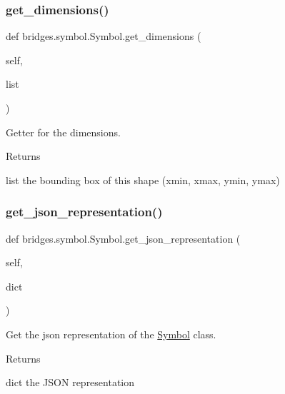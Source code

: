 \subsubsection{\texorpdfstring{get\+\_\+dimensions()}{get\_dimensions()}}
{\footnotesize\ttfamily def bridges.\+symbol.\+Symbol.\+get\+\_\+dimensions (\begin{DoxyParamCaption}\item[{}]{self,  }\item[{}]{list }\end{DoxyParamCaption})}



Getter for the dimensions. 

\begin{DoxyReturn}{Returns}


list the bounding box of this shape (xmin, xmax, ymin, ymax) 
\end{DoxyReturn}
\mbox{\label{classbridges_1_1symbol_1_1_symbol_a746f8e6d1fd1c63c8a9140a2af7436f8}} 
\subsubsection{\texorpdfstring{get\+\_\+json\+\_\+representation()}{get\_json\_representation()}}
{\footnotesize\ttfamily def bridges.\+symbol.\+Symbol.\+get\+\_\+json\+\_\+representation (\begin{DoxyParamCaption}\item[{}]{self,  }\item[{}]{dict }\end{DoxyParamCaption})}



Get the json representation of the \hyperlink{classbridges_1_1symbol_1_1_symbol}{Symbol} class. 

\begin{DoxyReturn}{Returns}


dict the J\+S\+ON representation 
\end{DoxyReturn}
\mbox{\label{classbridges_1_1symbol_1_1_symbol_a8abbc9a5c77eb7e2ef40338102a145c4}} 
